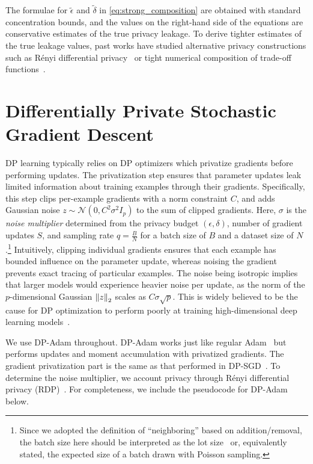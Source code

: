 The formulae for $\widetilde{\epsilon}$ and $\widetilde{\delta}$ in \eqref{eq:strong_composition} are obtained with standard concentration bounds, and the values on the right-hand side of the equations are conservative estimates of the true privacy leakage.
To derive tighter estimates of the true leakage values, past works have studied alternative privacy constructions such as R\'enyi differential privacy~\cite{mironov2017renyi} or tight numerical composition of trade-off functions~\cite{dong2019gaussian,gopi2021numerical,zhu2022optimal}.

\section[Differentially Private Stochastic Gradient Descent]{\large Differentially Private Stochastic Gradient Descent}

DP learning typically relies on DP optimizers which privatize gradients before performing updates. 
The privatization step ensures that parameter updates leak limited information about training examples through their gradients.
Specifically, this step clips per-example gradients with a norm constraint $C$, and adds Gaussian noise $z\sim\mathcal{N}(0, C^2\sigma^2 I_p)$ to the sum of clipped gradients.
Here, $\sigma$ is the \textit{noise multiplier} determined from the privacy budget $(\epsilon, \delta)$, number of gradient updates $S$, and sampling rate $q=\tfrac{B}{N}$ for a batch size of $B$ and a dataset size of $N$.\footnote{Since we adopted the definition of ``neighboring'' based on addition/removal, the batch size here should be interpreted as the lot size~\citep{abadi2016deep} or, equivalently stated, the expected size of a batch drawn with Poisson sampling.}
Intuitively, clipping individual gradients ensures that each example has bounded influence on the parameter update, whereas noising the gradient prevents exact tracing of particular examples.
The noise being isotropic implies that larger models would experience heavier noise per update, as the norm of the $p$-dimensional Gaussian $\left\lVert z\right\rVert_2$ scales as $C \sigma \sqrt{p}$.
This is widely believed to be the cause for DP optimization to perform poorly at training high-dimensional deep learning models~\citep{gautum14,yu2021not}.

We use DP-Adam throughout. DP-Adam works just like regular Adam~\citep{kingma2014adam} but performs updates and moment accumulation with privatized gradients. 
The gradient privatization part is the same as that performed in DP-SGD~\citep{song2013stochastic,abadi2016deep}.
To determine the noise multiplier, we account privacy through R\'enyi differential privacy (RDP)~\citep{mironov2017renyi,mironov2019r}.
For completeness, we include the pseudocode for DP-Adam below. 

